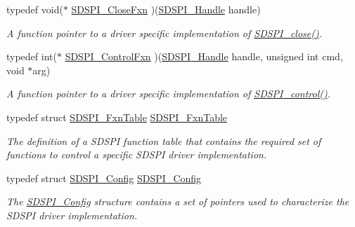 \begin{DoxyCompactItemize}
typedef void($\ast$ \hyperlink{_s_d_s_p_i_8h_a81531f5ec9d2e1b167e3c21edc1636cb}{S\-D\-S\-P\-I\-\_\-\-Close\-Fxn} )(\hyperlink{_s_d_s_p_i_8h_abd3d22133d60c2e5afd49722d6bafb7e}{S\-D\-S\-P\-I\-\_\-\-Handle} handle)
\begin{DoxyCompactList}\small\item\em A function pointer to a driver specific implementation of \hyperlink{_s_d_s_p_i_8h_a8816c223935b575f10acd5277b9a8ca5}{S\-D\-S\-P\-I\-\_\-close()}. \end{DoxyCompactList}\item 
typedef int($\ast$ \hyperlink{_s_d_s_p_i_8h_ad4f4fea0465def77622c20abb3519c6c}{S\-D\-S\-P\-I\-\_\-\-Control\-Fxn} )(\hyperlink{_s_d_s_p_i_8h_abd3d22133d60c2e5afd49722d6bafb7e}{S\-D\-S\-P\-I\-\_\-\-Handle} handle, unsigned int cmd, void $\ast$arg)
\begin{DoxyCompactList}\small\item\em A function pointer to a driver specific implementation of \hyperlink{_s_d_s_p_i_8h_a541a1db109382fe090ed7a9209a34f61}{S\-D\-S\-P\-I\-\_\-control()}. \end{DoxyCompactList}\item 
typedef struct \hyperlink{struct_s_d_s_p_i___fxn_table}{S\-D\-S\-P\-I\-\_\-\-Fxn\-Table} \hyperlink{_s_d_s_p_i_8h_a5d2665a5c69ea532a94acdc45ac1f456}{S\-D\-S\-P\-I\-\_\-\-Fxn\-Table}
\begin{DoxyCompactList}\small\item\em The definition of a S\-D\-S\-P\-I function table that contains the required set of functions to control a specific S\-D\-S\-P\-I driver implementation. \end{DoxyCompactList}\item 
typedef struct \hyperlink{struct_s_d_s_p_i___config}{S\-D\-S\-P\-I\-\_\-\-Config} \hyperlink{_s_d_s_p_i_8h_acd04506a18457faefc4f3639b6e0a0a1}{S\-D\-S\-P\-I\-\_\-\-Config}
\begin{DoxyCompactList}\small\item\em The \hyperlink{struct_s_d_s_p_i___config}{S\-D\-S\-P\-I\-\_\-\-Config} structure contains a set of pointers used to characterize the S\-D\-S\-P\-I driver implementation. \end{DoxyCompactList}\end{DoxyCompactItemize}
